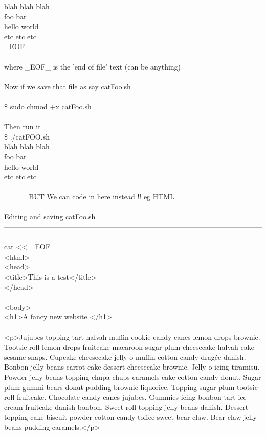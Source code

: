 \documentclass[10pt,a4paper]{article}
\begin{document}
{{{{{{{{{{{{{{{{blah blah blah\\
foo bar\\
hello world\\
etc etc etc\\
\_EOF\_\\
\\
where \_EOF\_  is the 'end of file' text (can be anything)\\
\\
Now if we save that file as say catFoo.sh\\
\\
\$ sudo chmod +x catFoo.sh\\
\\
Then  run it \\
\$ ./catFOO.sh  \\
blah blah blah\\
foo bar\\
hello world\\
etc etc etc\\
\\
====  BUT  We can code in here instead !! eg HTML\\
\\
Editing and saving catFoo.sh\\
-----------------------------------------------------------------------------------------------------------------------------------------------------------------------------\\
cat << \_EOF\_ \\
<html>\\
    <head>\\
        <title>This is a test</title>\\
    </head>\\
\\
    <body>\\
        <h1>A fancy new website </h1>\\
        \\
        <p>Jujubes topping tart halvah muffin cookie candy canes lemon drops brownie. Tootsie roll lemon drops fruitcake macaroon sugar plum cheesecake halvah cake sesame snaps. Cupcake cheesecake jelly-o muffin cotton candy dragée danish. Bonbon jelly beans carrot cake dessert cheesecake brownie. Jelly-o icing tiramisu. Powder jelly beans topping chupa chups caramels cake cotton candy donut. Sugar plum gummi bears donut pudding brownie liquorice. Topping sugar plum tootsie roll fruitcake. Chocolate candy canes jujubes. Gummies icing bonbon tart ice cream fruitcake danish bonbon. Sweet roll topping jelly beans danish. Dessert topping cake biscuit powder cotton candy toffee sweet bear claw. Bear claw jelly beans pudding caramels.</p>\\
}}}}}}}}}}}}}}}}
\end{document}
